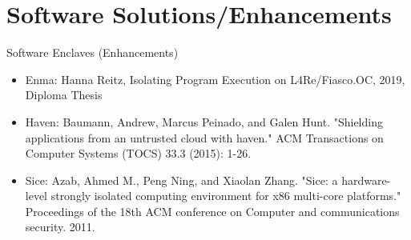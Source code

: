 \documentclass[aspectratio=169]{beamer}
\begin{document}
\section{Software Solutions/Enhancements}
\begin{frame}{Software Enclaves (Enhancements)}
    \begin{itemize}
        \item Enma: Hanna Reitz, Isolating Program Execution on L4Re/Fiasco.OC, 2019, Diploma Thesis
        \item Haven: Baumann, Andrew, Marcus Peinado, and Galen Hunt. "Shielding applications from an untrusted cloud with haven." {\footnotesize{ACM Transactions on Computer Systems (TOCS) 33.3 (2015): 1-26.}}
        \item Sice: Azab, Ahmed M., Peng Ning, and Xiaolan Zhang. "Sice: a hardware-level strongly isolated computing environment for x86 multi-core platforms." {\footnotesize{Proceedings of the 18th ACM conference on Computer and communications security. 2011.}}
    \end{itemize}
\end{frame}
\end{document}
